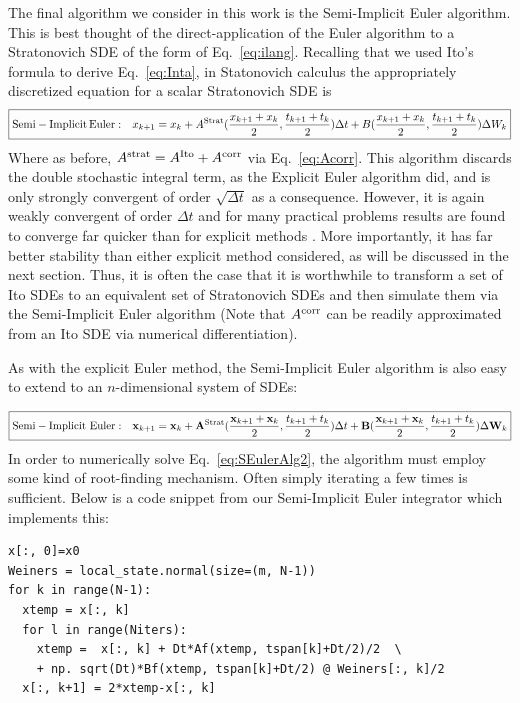 \documentclass[onecolumn,notitlepage,pra,10pt,aps]{revtex4-1}
\newcommand {\be}{\begin{equation}}
\newcommand {\ee}{\end{equation}}
\begin{document}
The final algorithm we consider in this work is the Semi-Implicit Euler algorithm.  This is best thought of the direct-application of the Euler algorithm to a Stratonovich SDE of the form of  Eq.~\eqref{eq:ilang}.  Recalling that we used Ito's formula to derive Eq.~\eqref{eq:Inta}, in Statonovich calculus the appropriately discretized equation for a scalar Stratonovich SDE is
\be
\boxed{
{\rm Semi-Implicit\, Euler:}\quad x_{k+1} = x_{k} + A^{\rm Strat}(\frac{x_{k+1}+x_k}{2},\frac{t_{k+1}+t_k}{2} )\Delta t +B(\frac{x_{k+1}+x_k}{2}, \frac{t_{k+1}+t_k}{2}) \Delta W_k \label{eq:SEulerAlg}
}
\ee
Where as before, $A^{\rm strat} = A^{\rm Ito}+ A^{\rm corr}$ via Eq.~\eqref{eq:Acorr}.   This algorithm discards the double stochastic integral term, as the Explicit Euler algorithm did, and is only strongly convergent of order $\sqrt{\Delta t}$ as a consequence.  However, it is again weakly convergent of order $\Delta t$ and for many practical problems results are found to converge far quicker than for explicit methods \cite{Drummond1991, Gardiner2004}.  More importantly, it has far better stability than either explicit method considered, as will be discussed in the next section.  Thus, it is often the case that it is worthwhile to transform a set of Ito SDEs to an equivalent set of Stratonovich SDEs and then simulate them via the Semi-Implicit Euler algorithm (Note that $A^{\rm corr}$ can be readily  approximated from an Ito SDE via numerical differentiation).

As with the explicit Euler method, the Semi-Implicit Euler algorithm is also easy to extend to an $n$-dimensional system of SDEs:

\be
\boxed{
{\rm Semi-Implicit\, \, Euler:}\quad \mathbf{x}_{k+1} = \mathbf{x}_{k} + \mathbf{A}^{\rm Strat}(\frac{\mathbf{x}_{k+1}+\mathbf{x}_k}{2},\frac{t_{k+1}+t_k}{2})\Delta t 
+\mathbf{B}(\frac{\mathbf{x}_{k+1}+\mathbf{x}_k}{2},\frac{t_{k+1}+t_k}{2}) \Delta \mathbf{W}_k
} \label{eq:SEulerAlg2}
\ee
In order to numerically solve Eq.~\eqref{eq:SEulerAlg2}, the algorithm must employ some kind of root-finding mechanism.  Often simply iterating a few times is sufficient.  Below is a code snippet from our  Semi-Implicit Euler integrator which implements this:
\begin{lstlisting}
x[:, 0]=x0
Weiners = local_state.normal(size=(m, N-1))
for k in range(N-1):
  xtemp = x[:, k]
  for l in range(Niters):
    xtemp =  x[:, k] + Dt*Af(xtemp, tspan[k]+Dt/2)/2  \
    + np. sqrt(Dt)*Bf(xtemp, tspan[k]+Dt/2) @ Weiners[:, k]/2
  x[:, k+1] = 2*xtemp-x[:, k]
\end{lstlisting}
\end{document}
